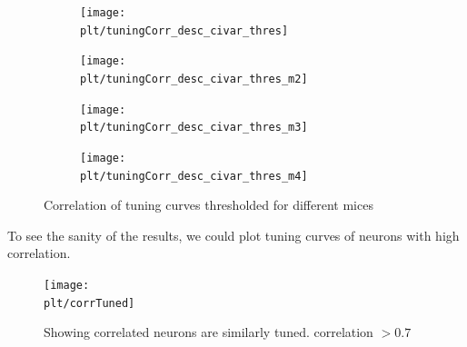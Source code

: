 \documentclass[11pt]{article}
\newcommand{\plt}{../../plots}
\begin{document}
\begin{figure}
    \centering
    \begin{subfigure}{.48\textwidth}
        \centering
        \texttt{[image: \\plt/tuningCorr\_desc\_civar\_thres]}
    \end{subfigure}
    \begin{subfigure}{.48\textwidth}
        \centering
        \texttt{[image: \\plt/tuningCorr\_desc\_civar\_thres\_m2]}
    \end{subfigure}
    \newline
    \begin{subfigure}{.48\textwidth}
        \centering
        \texttt{[image: \\plt/tuningCorr\_desc\_civar\_thres\_m3]}
    \end{subfigure}
    \begin{subfigure}{.48\textwidth}
        \centering
        \texttt{[image: \\plt/tuningCorr\_desc\_civar\_thres\_m4]}
    \end{subfigure}
    \caption{Correlation of tuning curves thresholded for different mices}
    \label{tuningCorr_thres}
\end{figure}
To see the sanity of the results, we could plot tuning curves of neurons with high correlation.
\begin{figure}[h]
    \centering
    \label{clusters}
    \texttt{[image: \\plt/corrTuned]}
    \caption{Showing correlated neurons are similarly tuned. correlation $> 0.7$}
\end{figure}
\end{document}
